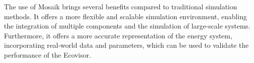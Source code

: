 The use of Mosaik brings several benefits compared to traditional simulation
methods. It offers a more flexible and scalable simulation environment, enabling
the integration of multiple components and the simulation of large-scale
systems. Furthermore, it offers a more accurate representation of the energy
system, incorporating real-world data and parameters, which can be used to
validate the performance of the Ecovisor.
